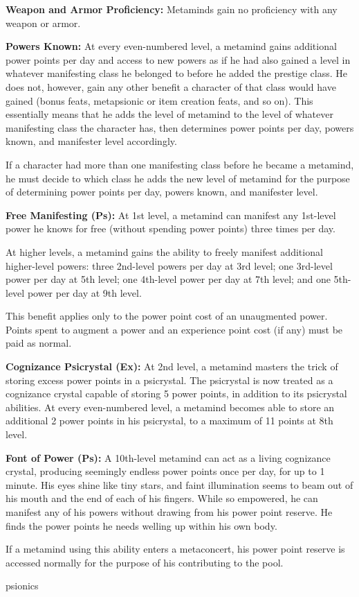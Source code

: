 {
\textbf{Weapon and Armor Proficiency:} Metaminds gain no proficiency with any weapon or armor.

\textbf{Powers Known:} At every even-numbered level, a metamind gains additional power points per day and access to new powers as if he had also gained a level in whatever manifesting class he belonged to before he added the prestige class. He does not, however, gain any other benefit a character of that class would have gained (bonus feats, metapsionic or item creation feats, and so on). This essentially means that he adds the level of metamind to the level of whatever manifesting class the character has, then determines power points per day, powers known, and manifester level accordingly.

If a character had more than one manifesting class before he became a metamind, he must decide to which class he adds the new level of metamind for the purpose of determining power points per day, powers known, and manifester level.

\textbf{Free Manifesting (Ps):} At 1st level, a metamind can manifest any 1st-level power he knows for free (without spending power points) three times per day.

At higher levels, a metamind gains the ability to freely manifest additional higher-level powers: three 2nd-level powers per day at 3rd level; one 3rd-level power per day at 5th level; one 4th-level power per day at 7th level; and one 5th-level power per day at 9th level.

This benefit applies only to the power point cost of an unaugmented power. Points spent to augment a power and an experience point cost (if any) must be paid as normal.

\textbf{Cognizance Psicrystal (Ex):} At 2nd level, a metamind masters the trick of storing excess power points in a psicrystal. The psicrystal is now treated as a cognizance crystal capable of storing 5 power points, in addition to its psicrystal abilities. At every even-numbered level, a metamind becomes able to store an additional 2 power points in his psicrystal, to a maximum of 11 points at 8th level.

\textbf{Font of Power (Ps):} A 10th-level metamind can act as a living cognizance crystal, producing seemingly endless power points once per day, for up to 1 minute. His eyes shine like tiny stars, and faint illumination seems to beam out of his mouth and the end of each of his fingers. While so empowered, he can manifest any of his powers without drawing from his power point reserve. He finds the power points he needs welling up within his own body.

If a metamind using this ability enters a metaconcert, his power point reserve is accessed normally for the purpose of his contributing to the pool.
}
{}
{psionics}
{}
{}
{}